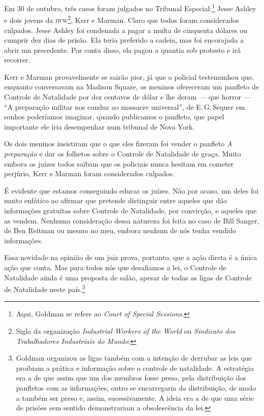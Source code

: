 Em 30 de outubro, três casos foram julgados no Tribunal Especial:\footnote{Aqui, Goldman se refere ao \textit{Court of Special Sessions}.} Jesse Ashley e dois jovens da
\textsc{iww}\footnote{Sigla da organização \textit{Industrial Workers of the
  World} ou \textit{Sindicato dos Trabalhadores Industriais do Mundo}.}, Kerr
e Marman. Claro que todos foram considerados culpados. Jesse Ashley foi
condenada a pagar a multa de cinquenta dólares ou cumprir dez dias de prisão.
Ela teria preferido a cadeia, mas foi encorajada a abrir um precedente.
Por conta disso, ela pagou a quantia sob protesto e irá recorrer.

Kerr e Marman provavelmente se sairão pior, já que o policial
testemunhou que, enquanto conversavam na Madison Square, os meninos
ofereceram um panfleto de Controle de Natalidade por dez centavos de
dólar e lhe deram --- que horror --- ``A preparação militar nos conduz
ao massacre universal'', de E.\,G.\,Sequer em sonhos poderíamos
imaginar, quando publicamos o panfleto, que papel importante ele iria
desempenhar num tribunal de Nova York.

Os dois meninos insistiram que o que eles fizeram foi vender o panfleto
\textit{A preparação} e dar os folhetos sobre o Controle de Natalidade de
graça. Muito embora os juízes todos saibam que os policiais nunca
hesitam em cometer perjúrio, Kerr e Marman foram considerados culpados.

É evidente que estamos conseguindo educar os juízes. Não por acaso, um
deles foi muito enfático ao afirmar que pretende distinguir entre
aqueles que dão informações gratuitas sobre Controle de Natalidade, por
convicção, e aqueles que as vendem. Nenhuma consideração dessa natureza
foi feita no caso de Bill Sanger, de Ben Reitman ou mesmo no meu, embora
nenhum de nós tenha vendido informações.

Essa novidade na opinião de um juiz prova, portanto, que a ação direta é
a única ação que conta. Mas para todos nós que desafiamos a lei, o
Controle de Natalidade ainda é uma proposta de salão, apesar de todas as
ligas de Controle de Natalidade neste país.\footnote{Goldman organizou
  as ligas também com a intenção de derrubar as leis que proibiam a
  prática e informação sobre o controle de natalidade. A estratégia era
  a de que assim que um dos membros fosse preso, pela distribuição dos panfletos com as informações, outro se encarregaria da distribuição, de modo a também ser preso e, assim, sucessivamente. A ideia era a de que uma série de prisões sem sentido demonstrariam a
  obsolescência da lei.}

